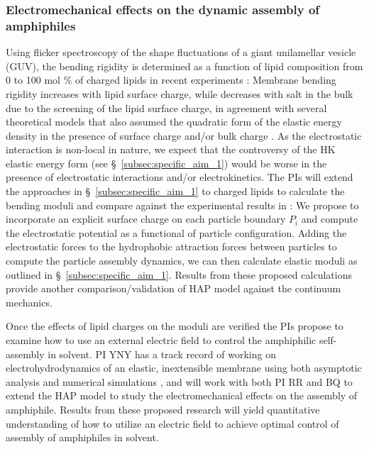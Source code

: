 \subsubsection{Electromechanical effects on the dynamic assembly of amphiphiles \label{subsubsec:em_effects}}
Using flicker spectroscopy of the
shape fluctuations of a giant unilamellar vesicle (GUV), the bending rigidity is determined as a function of lipid 
composition from 0 to 100 mol $\%$ of charged lipids in recent experiments \cite{FaizEtAl2019_SoftMatt}:
Membrane bending rigidity increases with lipid surface charge, while decreases with salt in the bulk due to the screening of the lipid surface charge,
in agreement with several theoretical models \cite{Kralchevsky1996_JCIS,May1996_JChemPhys,LoubetEtAl2013_PRE} that also assumed the quadratic form of the elastic energy
density in the presence of surface charge and/or bulk charge \cite{DuplantierGoldstein1990_PRL,Winterhalter1992_JPC}. 
As the electrostatic interaction is non-local in nature, we expect that the controversy of the HK elastic energy form (see \S~\ref{subsec:specific_aim_1}) 
would be worse in the presence of electrostatic interactions and/or electrokinetics. The PIs will extend the approaches in \S~\ref{subsec:specific_aim_1} to charged lipids to calculate the bending moduli and compare against the experimental results in \cite{FaizEtAl2019_SoftMatt}: We propose to incorporate an explicit surface charge on each particle boundary $P_i$
and compute the electrostatic potential as a functional of particle configuration. Adding the electrostatic forces to the hydrophobic attraction forces between particles to compute the particle assembly dynamics, we can then calculate elastic moduli as outlined in \S~\ref{subsec:specific_aim_1}. Results from these proposed calculations provide another comparison/validation of HAP model against the continuum mechanics.

Once the effects of lipid charges on the moduli are verified the PIs propose to examine how to use 
an external electric field to control the amphiphilic self-assembly in solvent. 
PI YNY has a track record of working on electrohydrodynamics
of an elastic, inextensible membrane using both asymptotic analysis \cite{Nganguia2013_PRE,Young2014_JFM,Young2015_PoF} and numerical simulations \cite{Nganguia2015_CiCP}, and will work with both PI RR and BQ to extend the HAP model to study the electromechanical effects on the assembly of amphiphile.
Results from these proposed research will yield quantitative understanding of how to utilize an electric field to achieve optimal control of assembly of amphiphiles in solvent.




